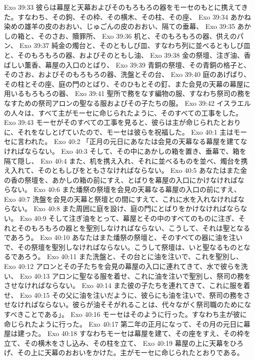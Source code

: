 Exo 39:33  彼らは幕屋と天幕およびそのもろもろの器をモーセのもとに携えてきた。すなわち、その鉤、その枠、その横木、その柱、その座、
Exo 39:34  あかね染めの雄羊の皮のおおい、じゅごんの皮のおおい、隔ての垂幕、
Exo 39:35  あかしの箱と、そのさお、贖罪所、
Exo 39:36  机と、そのもろもろの器、供えのパン、
Exo 39:37  純金の燭台と、そのともしび皿、すなわち列に並べるともしび皿と、そのもろもろの器、およびそのともし油、
Exo 39:38  金の祭壇、注ぎ油、香ばしい薫香、幕屋の入口のとばり、
Exo 39:39  青銅の祭壇、その青銅の格子と、そのさお、およびそのもろもろの器、洗盤とその台、
Exo 39:40  庭のあげばり、その柱とその座、庭の門のとばり、そのひもとその釘、また会見の天幕の幕屋に用いるもろもろの器、
Exo 39:41  聖所で務をなす編物の服、すなわち祭司の務をなすための祭司アロンの聖なる服およびその子たちの服。
Exo 39:42  イスラエルの人々は、すべて主がモーセに命じられたように、そのすべての工事をした。
Exo 39:43  モーセがそのすべての工事を見ると、彼らは主が命じられたとおりに、それをなしとげていたので、モーセは彼らを祝福した。
Exo 40:1  主はモーセに言われた。
Exo 40:2  「正月の元日にあなたは会見の天幕なる幕屋を建てなければならない。
Exo 40:3  そして、その中にあかしの箱を置き、垂幕で、箱を隔て隠し、
Exo 40:4  また、机を携え入れ、それに並べるものを並べ、燭台を携え入れて、そのともしびをともさなければならない。
Exo 40:5  あなたはまた金の香の祭壇を、あかしの箱の前にすえ、とばりを幕屋の入口にかけなければならない。
Exo 40:6  また燔祭の祭壇を会見の天幕なる幕屋の入口の前にすえ、
Exo 40:7  洗盤を会見の天幕と祭壇との間にすえて、これに水を入れなければならない。
Exo 40:8  また周囲に庭を設け、庭の門にとばりをかけなければならない。
Exo 40:9  そして注ぎ油をとって、幕屋とその中のすべてのものに注ぎ、それとそのもろもろの器とを聖別しなければならない、こうして、それは聖となるであろう。
Exo 40:10  あなたはまた燔祭の祭壇と、そのすべての器に油を注いで、その祭壇を聖別しなければならない。こうして祭壇は、いと聖なるものとなるであろう。
Exo 40:11  また洗盤と、その台とに油を注いで、これを聖別し、
Exo 40:12  アロンとその子たちを会見の幕屋の入口に連れてきて、水で彼らを洗い、
Exo 40:13  アロンに聖なる服を着せ、これに油を注いで聖別し、祭司の務をさせなければならない。
Exo 40:14  また彼の子たちを連れてきて、これに服を着せ、
Exo 40:15  その父に油を注いだように、彼らにも油を注いで、祭司の務をさせなければならない。彼らが油そそがれることは、代々ながく祭司職のためになすべきことである」。
Exo 40:16  モーセはそのように行った。すなわち主が彼に命じられたように行った。
Exo 40:17  第二年の正月になって、その月の元日に幕屋は建った。
Exo 40:18  すなわちモーセは幕屋を建て、その座をすえ、その枠を立て、その横木をさし込み、その柱を立て、
Exo 40:19  幕屋の上に天幕をひろげ、その上に天幕のおおいをかけた。主がモーセに命じられたとおりである。
